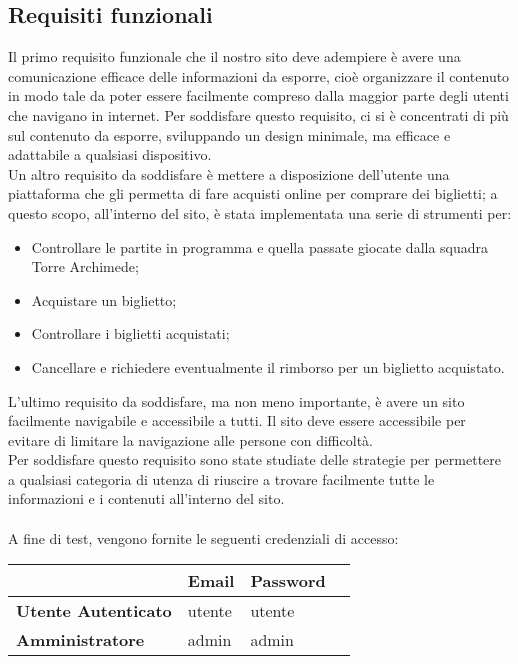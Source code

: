    \subsection{Requisiti funzionali}
    Il primo requisito funzionale che il nostro sito deve adempiere è avere una comunicazione efficace delle informazioni da esporre, cioè organizzare il contenuto in modo tale da poter essere facilmente compreso dalla maggior parte degli utenti che navigano in internet. Per soddisfare questo requisito, ci si è concentrati di più sul contenuto da esporre, sviluppando un design minimale, ma efficace e adattabile a qualsiasi dispositivo.\\
    Un altro requisito da soddisfare è mettere a disposizione dell'utente una piattaforma che gli permetta di fare acquisti online per comprare dei biglietti; a questo scopo, all'interno del sito, è stata implementata una serie di strumenti per:
    
    \begin{itemize}
        \item Controllare le partite in programma e quella passate giocate dalla squadra Torre Archimede;
        \item Acquistare un biglietto;
        \item Controllare i biglietti acquistati;
        \item Cancellare e richiedere eventualmente il rimborso per un biglietto acquistato.
    \end{itemize}
    
    \noindent
    L'ultimo requisito da soddisfare, ma non meno importante, è avere un sito facilmente navigabile e accessibile a tutti. Il sito deve essere accessibile per evitare di limitare la navigazione alle persone con difficoltà.\\
    Per soddisfare questo requisito sono state studiate delle strategie per permettere a qualsiasi categoria di utenza di riuscire a trovare facilmente tutte le informazioni e i contenuti all'interno del sito.\\
    \vspace*{0.05in} \\
    A fine di test, vengono fornite le seguenti credenziali di accesso:
    \vspace*{0.1in} \\
    \begin{center}
        \begin{tabular}{ |p{3cm}|p{3cm}|p{3cm}|p{3cm} } 
        \hline
         & \textbf{Email} & \textbf{Password} \\
        \hline
        \textbf{Utente Autenticato} & utente & utente\\
        \hline
        \textbf{Amministratore} & admin & admin\\
        \hline
        \end{tabular}
    \end{center}
    

